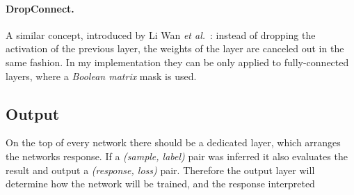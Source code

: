 \paragraph{DropConnect.} A similar concept, introduced by Li Wan \emph{et al.}~\cite{dropcon}: 
instead of dropping the activation of the previous layer, the weights of the layer are canceled out in the same fashion.
In my implementation they can be only applied to fully-connected layers, where a \emph{Boolean matrix} mask is used.

\subsection{Output} 
On the top of every network there should be a dedicated layer, which arranges the networks response. 
If a \emph{(sample, label)} pair was inferred it also evaluates the result and output a \emph{(response, loss)} pair.
Therefore the output layer will determine how the network will be trained, and the response interpreted
